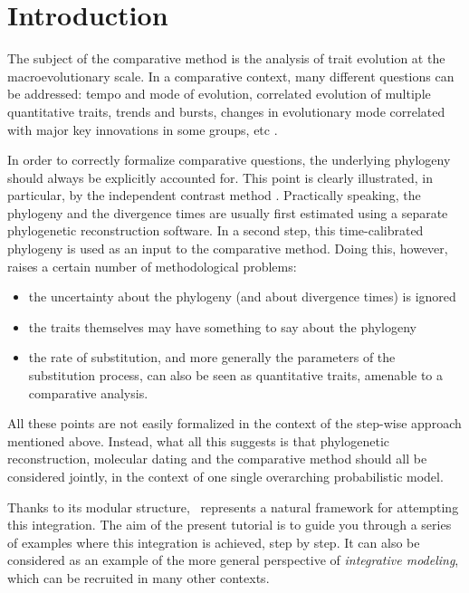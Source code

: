 \section{Introduction}

The subject of the comparative method is the analysis of trait evolution at the macroevolutionary scale.
In a comparative context, many different questions can be addressed: tempo and mode of evolution, correlated evolution of multiple quantitative traits, trends and bursts, changes in evolutionary mode correlated with major key innovations in some groups, etc \citep[see][for a good introduction]{Harvey1991}.

In order to correctly formalize comparative questions, the underlying phylogeny should always be explicitly accounted for. This point is clearly illustrated, in particular, by the independent contrast method \citep{Felsenstein1985a}. Practically speaking, the phylogeny and the divergence times are usually first estimated using a separate phylogenetic reconstruction software. In a second step, this time-calibrated phylogeny is used as an input to the comparative method.
Doing this, however, raises a certain number of methodological problems:
\begin{itemize}
\item
the uncertainty about the phylogeny (and about divergence times) is ignored
\item
the traits themselves may have something to say about the phylogeny
\item
the rate of substitution, and more generally the parameters of the substitution process, can also be seen as quantitative traits, amenable to a comparative analysis.
\end{itemize}
All these points are not easily formalized in the context of the step-wise approach mentioned above.
Instead, what all this suggests is that phylogenetic reconstruction, molecular dating and the comparative method should all be considered jointly, in the context of one single overarching probabilistic model.

Thanks to its modular structure, \RevBayes~represents a natural framework for attempting this integration.
The aim of the present tutorial is to guide you through a series of examples where this integration is achieved, step by step.
It can also be considered as an example of the more general perspective of \emph{integrative modeling}, which can be recruited in many other contexts.




